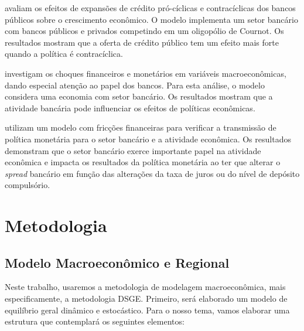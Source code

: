 \documentclass[12pt]{article}
\numberwithin{equation}{section}
\theoremstyle{definition}
\begin{document}
\textcite{capeleti_countercyclical_2022} avaliam os efeitos de expansões de crédito pró-cíclicas e contracíclicas dos bancos públicos sobre o crescimento econômico. O modelo implementa um setor bancário com bancos públicos e privados competindo em um oligopólio de Cournot. Os resultados mostram que a oferta de crédito público tem um efeito mais forte quando a política é contracíclica.

\textcite{soltani_investigating_2021} investigam os choques financeiros e monetários em variáveis macroeconômicas, dando especial atenção ao papel dos bancos. Para esta análise, o modelo considera uma economia com setor bancário. Os resultados mostram que a atividade bancária pode influenciar os efeitos de políticas econômicas.

\textcite{vinhado_politica_2016} utilizam um modelo com fricções financeiras para verificar a transmissão de política monetária para o setor bancário e a atividade econômica. Os resultados demonstram que o setor bancário exerce importante papel na atividade econômica e impacta os resultados da política monetária ao ter que alterar o \textit{spread} bancário em função das alterações da taxa de juros ou do nível de depósito compulsório.

\newpage

\section{Metodologia}\label{sec:metodologia}


\subsection{Modelo Macroeconômico e Regional}

Neste trabalho, usaremos a metodologia de modelagem macroeconômica, mais especificamente, a metodologia DSGE. Primeiro, será elaborado um modelo de equilíbrio geral dinâmico e estocástico. Para o nosso tema, vamos elaborar uma estrutura que contemplará os seguintes elementos:
\end{document}
